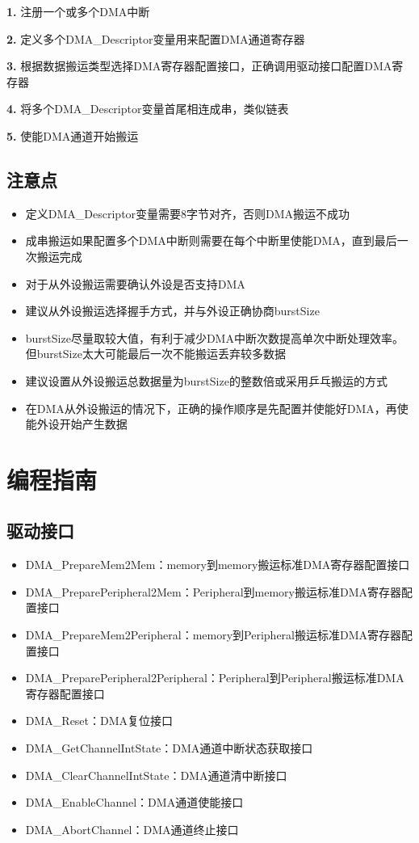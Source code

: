 \documentclass[
  12pt,
]{book}
\begin{document}
\textbf{1.} 注册一个或多个DMA中断

\textbf{2.} 定义多个DMA\_Descriptor变量用来配置DMA通道寄存器

\textbf{3.} 根据数据搬运类型选择DMA寄存器配置接口，正确调用驱动接口配置DMA寄存器

\textbf{4.} 将多个DMA\_Descriptor变量首尾相连成串，类似链表

\textbf{5.} 使能DMA通道开始搬运

\hypertarget{ux6ce8ux610fux70b9-1}{%
\subsection{注意点}\label{ux6ce8ux610fux70b9-1}}

\begin{itemize}
\item
  定义DMA\_Descriptor变量需要8字节对齐，否则DMA搬运不成功
\item
  成串搬运如果配置多个DMA中断则需要在每个中断里使能DMA，直到最后一次搬运完成
\item
  对于从外设搬运需要确认外设是否支持DMA
\item
  建议从外设搬运选择握手方式，并与外设正确协商burstSize
\item
  burstSize尽量取较大值，有利于减少DMA中断次数提高单次中断处理效率。但burstSize太大可能最后一次不能搬运丢弃较多数据
\item
  建议设置从外设搬运总数据量为burstSize的整数倍或采用乒乓搬运的方式
\item
  在DMA从外设搬运的情况下，正确的操作顺序是先配置并使能好DMA，再使能外设开始产生数据
\end{itemize}

\hypertarget{ux7f16ux7a0bux6307ux5357-1}{%
\section{编程指南}\label{ux7f16ux7a0bux6307ux5357-1}}

\hypertarget{ux9a71ux52a8ux63a5ux53e3-1}{%
\subsection{驱动接口}\label{ux9a71ux52a8ux63a5ux53e3-1}}

\begin{itemize}
\item
  DMA\_PrepareMem2Mem：memory到memory搬运标准DMA寄存器配置接口
\item
  DMA\_PreparePeripheral2Mem：Peripheral到memory搬运标准DMA寄存器配置接口
\item
  DMA\_PrepareMem2Peripheral：memory到Peripheral搬运标准DMA寄存器配置接口
\item
  DMA\_PreparePeripheral2Peripheral：Peripheral到Peripheral搬运标准DMA寄存器配置接口
\item
  DMA\_Reset：DMA复位接口
\item
  DMA\_GetChannelIntState：DMA通道中断状态获取接口
\item
  DMA\_ClearChannelIntState：DMA通道清中断接口
\item
  DMA\_EnableChannel：DMA通道使能接口
\item
  DMA\_AbortChannel：DMA通道终止接口
\end{itemize}
\end{document}
